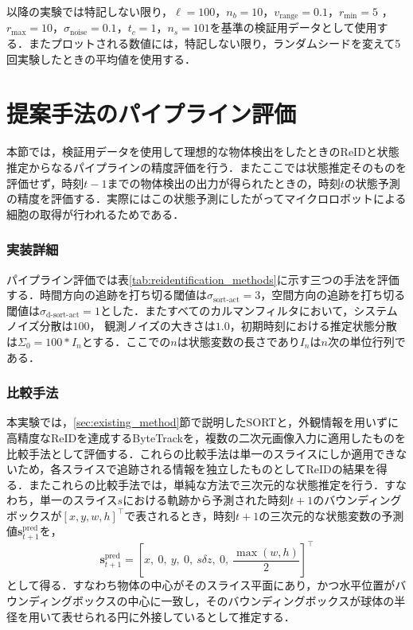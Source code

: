 以降の実験では特記しない限り，$\ell = 100$，$n_b = 10$，$v_{\text{range}} = 0.1$，$r_{\text{min}} = 5$ ，$r_{\text{max}} = 10$，$\sigma_{\text{noise}} = 0.1$，$t_c = 1$，$n_s = 101$を基準の検証用データとして使用する．またプロットされる数値には，特記しない限り，ランダムシードを変えて5回実験したときの平均値を使用する．

\section{提案手法のパイプライン評価}
\label{sec:pipeline_evaluation}

本節では，検証用データを使用して理想的な物体検出をしたときのReIDと状態推定からなるパイプラインの精度評価を行う．またここでは状態推定そのものを評価せず，時刻$t-1$までの物体検出の出力が得られたときの，時刻$t$の状態予測の精度を評価する．実際にはこの状態予測にしたがってマイクロロボットによる細胞の取得が行われるためである．

\subsubsection{実装詳細}
パイプライン評価では表\ref{tab:reidentification_methods}に示す三つの手法を評価する．時間方向の追跡を打ち切る閾値は$\sigma_{\text{sort-act}} = 3$，空間方向の追跡を打ち切る閾値は$\sigma_{\text{d-sort-act}} = 1$とした．またすべてのカルマンフィルタにおいて，システムノイズ分散は$100$，
観測ノイズの大きさは$1.0$，初期時刻における推定状態分散は$\Sigma_0 = 100 * I_n$とする．ここでの$n$は状態変数の長さであり$I_n$は$n$次の単位行列である．

\subsubsection{比較手法}
本実験では，\ref{sec:existing_method}節で説明したSORTと，外観情報を用いずに高精度なReIDを達成するByteTrack\cite{zhang2022bytetrack}を，複数の二次元画像入力に適用したものを比較手法として評価する．これらの比較手法は単一のスライスにしか適用できないため，各スライスで追跡される情報を独立したものとしてReIDの結果を得る．またこれらの比較手法では，単純な方法で三次元的な状態推定を行う．すなわち，単一のスライス$s$における軌跡から予測された時刻$t + 1$のバウンディングボックスが$[x, y, w, h]^{\top}$で表されるとき，時刻$t+1$の三次元的な状態変数の予測値$\bm{s}_{t+1}^{\text{pred}}$を，
\begin{equation}
    \label{eq:naive_state_estimation}
    \bm{s}^{\text{pred}}_{t+1} = \left[x,~ 0,~ y,~ 0,~ s \delta z,~ 0,~ \frac{\max(w, h)}{2}\right]^{\top}
\end{equation}
として得る．すなわち物体の中心がそのスライス平面にあり，かつ水平位置がバウンディングボックスの中心に一致し，そのバウンディングボックスが球体の半径を用いて表せられる円に外接しているとして推定する．

